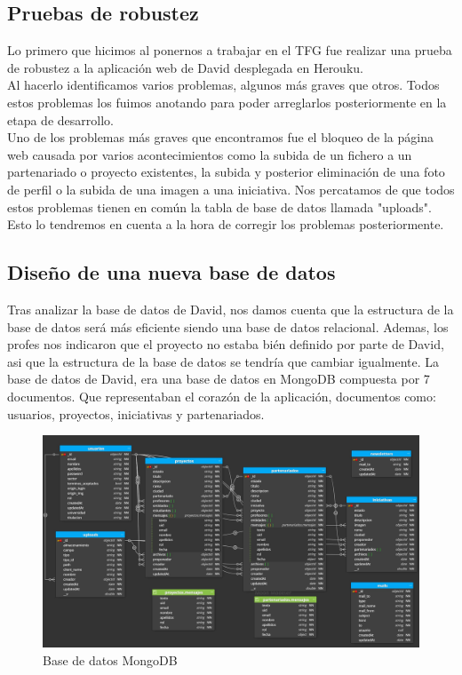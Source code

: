 \documentclass{article}
\begin{document}
\subsection{Pruebas de robustez}
Lo primero que hicimos al ponernos a trabajar en el TFG fue realizar una prueba de robustez a la aplicación web de David desplegada en Herouku.\\
Al hacerlo identificamos varios problemas, algunos más graves que otros. Todos estos problemas los fuimos anotando para poder arreglarlos posteriormente en la etapa de desarrollo.\\
Uno de los problemas más graves que encontramos fue el bloqueo de la página web causada por varios acontecimientos como la subida de un fichero a un partenariado o proyecto existentes, la subida y posterior eliminación de una foto de perfil o la subida de una imagen a una iniciativa. Nos percatamos de que todos estos problemas tienen en común la tabla de base de datos llamada "uploads". Esto lo tendremos en cuenta a la hora de corregir los problemas 
posteriormente.

\subsection{Diseño de una nueva base de datos}
Tras analizar la base de datos de David, nos damos cuenta que la estructura de la base de datos será más eficiente siendo una base de datos relacional. Ademas, los profes nos indicaron que el proyecto no estaba bién definido por parte de David, asi que la estructura de la base de datos se tendría que cambiar igualmente.
La base de datos de David, era una base de datos en MongoDB compuesta por 7 documentos. Que representaban el corazón de la aplicación, documentos como: usuarios, proyectos, iniciativas y partenariados.
\begin{figure}[h!]
	\centering
	\includegraphics[scale=0.25]{bdmongo}
	\caption{Base de datos MongoDB}
	\label{fig:universe}
\end{figure}
\end{document}
